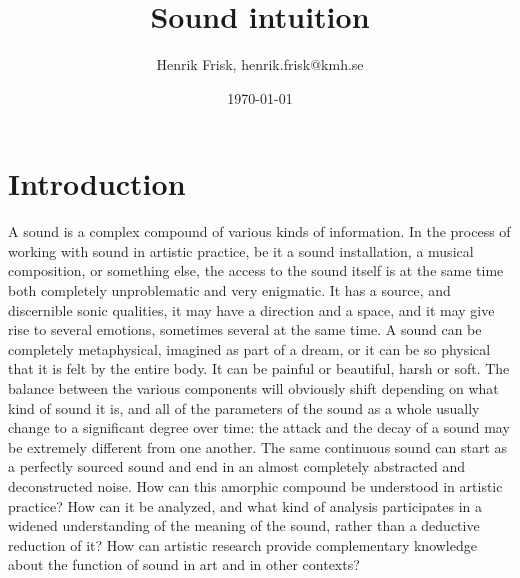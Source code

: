 \documentclass[11pt]{article}
\author{Henrik Frisk, henrik.frisk@kmh.se}
\date{\today}
\title{Sound intuition}
\begin{document}
\maketitle
\section*{Introduction}
\label{sec:org06905b8}
A sound is a complex compound of various kinds of information.
In the process of working with sound in artistic practice, be it a sound installation, a musical composition, or something else, the access to the sound itself is at the same time both completely unproblematic and very enigmatic.
It has a source, and discernible sonic qualities, it may have a direction and a space, and it may give rise to several emotions, sometimes several at the same time.
A sound can be completely metaphysical, imagined as part of a dream, or it can be so physical that it is felt by the entire body.
It can be painful or beautiful, harsh or soft.
The balance between the various components will obviously shift depending on what kind of sound it is, and all of the parameters of the sound as a whole usually change to a significant degree over time: the attack and the decay of a sound may be extremely different from one another.
The same continuous sound can start as a perfectly sourced sound and end in an almost completely abstracted and deconstructed noise.
How can this amorphic compound be understood in artistic practice? How can it be analyzed, and what kind of analysis participates in a widened understanding of the meaning of the sound, rather than a deductive reduction of it? How can artistic research provide complementary knowledge about the function of sound in art and in other contexts?
\end{document}
